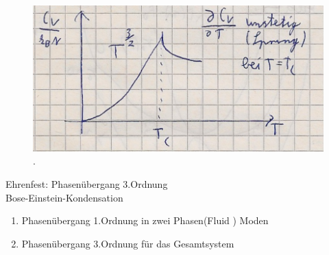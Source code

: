 \begin{figure}[H]
  \centering
  \includegraphics[width = \textwidth]{Zeichnungen/35.pdf}
  \caption{.}
\end{figure}
Ehrenfest: Phasenübergang 3.Ordnung \\

Bose-Einstein-Kondensation
\begin{enumerate}
    \item Phasenübergang 1.Ordnung in zwei Phasen(Fluid ) Moden
    \item Phasenübergang 3.Ordnung für das Gesamtsystem
\end{enumerate}
